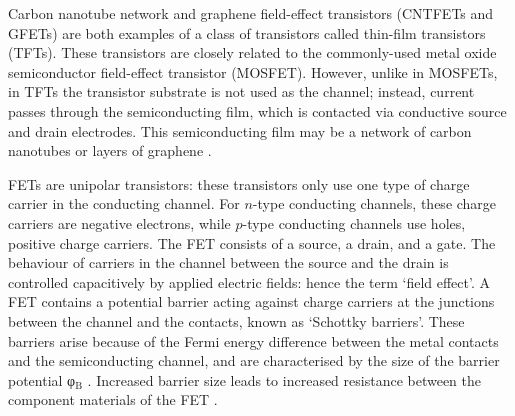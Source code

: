 \documentclass[
  a4paper,
]{scrbook}
\begin{document}
Carbon nanotube network and graphene field-effect transistors (CNTFETs
and GFETs) are both examples of a class of transistors called thin-film
transistors (TFTs). These transistors are closely related to the
commonly-used metal oxide semiconductor field-effect transistor
(MOSFET). However, unlike in MOSFETs, in TFTs the transistor substrate
is not used as the channel; instead, current passes through the
semiconducting film, which is contacted via conductive source and drain
electrodes. This semiconducting film may be a network of carbon
nanotubes or layers of graphene \autocite{Sun2013}.

FETs are unipolar transistors: these transistors only use one type of
charge carrier in the conducting channel. For \(n\)-type conducting
channels, these charge carriers are negative electrons, while \(p\)-type
conducting channels use holes, positive charge carriers. The FET
consists of a source, a drain, and a gate. The behaviour of carriers in
the channel between the source and the drain is controlled capacitively
by applied electric fields: hence the term `field effect'. A FET
contains a potential barrier acting against charge carriers at the
junctions between the channel and the contacts, known as `Schottky
barriers'. These barriers arise because of the Fermi energy difference
between the metal contacts and the semiconducting channel, and are
characterised by the size of the barrier potential φ\(_\textrm{B}\)
\autocite{Iijima1991}. Increased barrier size leads to increased
resistance between the component materials of the FET
\autocite{Zheng2016}.
\end{document}
